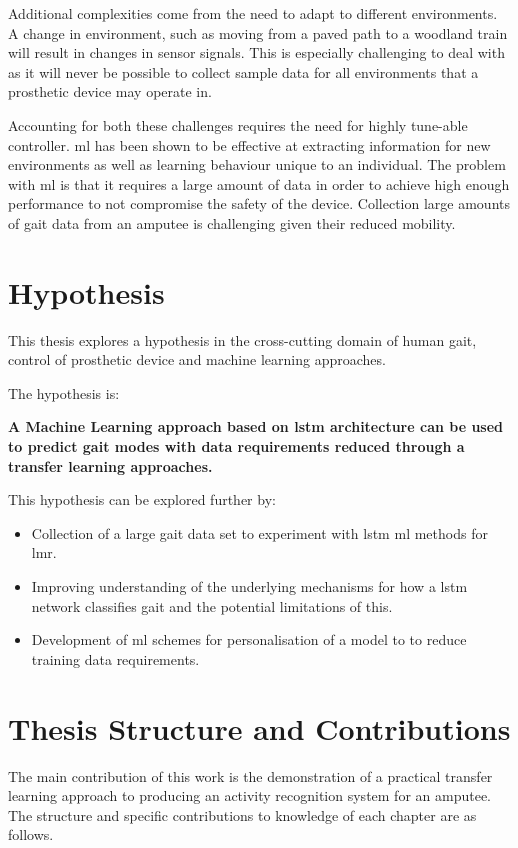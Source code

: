 Additional complexities come from the need to adapt to different environments. A change in environment, such as moving from a paved path to a woodland train will result in changes in sensor signals. This is especially challenging to deal with as it will never be possible to collect sample data for all environments that a prosthetic device may operate in.

Accounting for both these challenges requires the need for highly tune-able controller. \acrfull{ml} has been shown to be effective at extracting information for new environments as well as learning behaviour unique to an individual. The problem with \acrshort{ml} is that it requires a large amount of data in order to achieve high enough performance to not compromise the safety of the device. Collection large amounts of gait data from an amputee is challenging given their reduced mobility.

\section{Hypothesis} %
This thesis explores a hypothesis in the cross-cutting domain of human gait, control of prosthetic device and machine learning approaches.

The hypothesis is:

\textbf{A Machine Learning approach based on \acrfull{lstm} architecture can be used to predict gait modes with data requirements reduced through a transfer learning approaches.}

This hypothesis can be explored further by: 

\begin{itemize}
    \item Collection of a large gait data set to experiment with \acrshort{lstm} \acrshort{ml} methods for \acrfull{lmr}.
    \item Improving understanding of the underlying mechanisms for how a \acrshort{lstm} network classifies gait and the potential limitations of this.
    \item Development of \acrshort{ml} schemes for personalisation of a model to to reduce training data requirements.
\end{itemize}


\section{Thesis Structure and Contributions}
The main contribution of this work is the demonstration of a practical transfer learning approach to producing an activity recognition system for an amputee. The structure and specific contributions to knowledge of each chapter are as follows.

